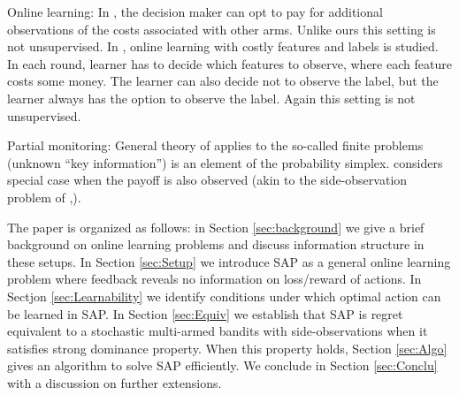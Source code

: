 Online learning: In 
\cite{SBCA14:BanditsPaid}, the decision maker can opt to pay for additional observations of the costs associated with other arms. Unlike ours this setting is not unsupervised. In
\cite{ZBGGySz13:CostlyFeatures}, online learning with costly features and labels is studied.
In each round, learner has to decide which features to observe, where each feature costs some money. The learner can also decide not to observe the label, but the learner always has the option
to observe the label. Again this setting is not unsupervised.

Partial monitoring:
General theory of \cite{BaFoPaRaSze14} 
applies to the so-called finite problems (unknown ``key information'') is an element of the probability simplex.
\cite{AgTeAn89:pmon} considers special case when the payoff is also observed (akin to the side-observation problem of \cite{MaSh11}\cite{COLT15_OnlineLearningWithFeedback_AlonBianchiDekel},\cite{NIPS13_FromBanditsToExperts_AlonBianchiGentile}).

The paper is organized as follows: in Section \ref{sec:background} we give a brief background on online learning problems and discuss information structure in these setups. In Section \ref{sec:Setup} we introduce SAP as a general online learning problem where feedback reveals no information on loss/reward of actions. In Sectjon \ref{sec:Learnability} we identify conditions under which optimal action can be learned in SAP. In Section \ref{sec:Equiv} we establish that SAP is regret equivalent to a stochastic multi-armed bandits with side-observations when it satisfies strong dominance property. When this property holds, Section \ref{sec:Algo} gives an algorithm to solve SAP efficiently. We conclude in Section \ref{sec:Conclu} with a discussion on further extensions.  